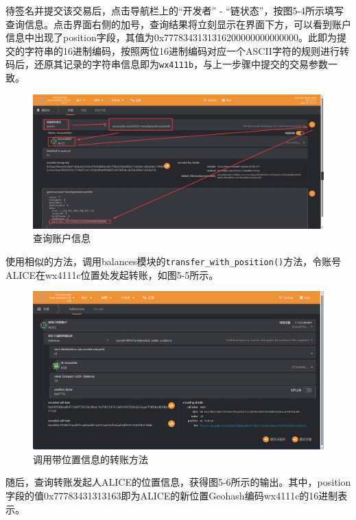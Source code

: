 待签名并提交该交易后，点击导航栏上的“开发者” - “链状态”，按图5-4所示填写查询信息。点击界面右侧的加号，查询结果将立刻显示在界面下方，可以看到账户信息中出现了position字段，其值为0x7778343131316200000000000000。此即为提交的字符串的16进制编码，按照两位16进制编码对应一个ASCII字符的规则进行转码后，还原其记录的字符串信息即为\verb|wx4111b|，与上一步骤中提交的交易参数一致。

\begin{figure}[htbp]
    \centering
    \includegraphics[width=\textwidth]{images/watchAccInfo.png}
    \caption{查询账户信息}\label{查询账户信息} %
\end{figure}

使用相似的方法，调用balances模块的\verb|transfer_with_position()|方法，令账号ALICE在wx4111c位置处发起转账，如图5-5所示。

\begin{figure}[htbp]
    \centering
    \includegraphics[width=\textwidth]{images/transWithPos.png}
    \caption{调用带位置信息的转账方法}\label{调用带位置信息的转账方法} %
\end{figure}

随后，查询转账发起人ALICE的位置信息，获得图5-6所示的输出。其中，position字段的值0x77783431313163即为ALICE的新位置Geohash编码wx4111c的16进制表示。

